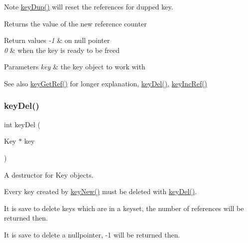 \begin{DoxyNote}{Note}
\hyperlink{group__key_gae6ec6a60cc4b8c1463fa08623d056ce3}{key\+Dup()} will reset the references for dupped key.
\end{DoxyNote}
\begin{DoxyReturn}{Returns}
the value of the new reference counter 
\end{DoxyReturn}

\begin{DoxyRetVals}{Return values}
{\em -\/1} & on null pointer \\
\hline
{\em 0} & when the key is ready to be freed \\
\hline
\end{DoxyRetVals}

\begin{DoxyParams}{Parameters}
{\em key} & the key object to work with \\
\hline
\end{DoxyParams}
\begin{DoxySeeAlso}{See also}
\hyperlink{group__key_ga4aabc4272506dd63161db2bbb42de8ae}{key\+Get\+Ref()} for longer explanation, \hyperlink{group__key_ga3df95bbc2494e3e6703ece5639be5bb1}{key\+Del()}, \hyperlink{group__key_ga6970a6f254d67af7e39f8e469bb162f1}{key\+Inc\+Ref()} 
\end{DoxySeeAlso}
\mbox{\label{group__key_ga3df95bbc2494e3e6703ece5639be5bb1}} 
\subsubsection{\texorpdfstring{key\+Del()}{keyDel()}}
{\footnotesize\ttfamily int key\+Del (\begin{DoxyParamCaption}\item[{Key $\ast$}]{key }\end{DoxyParamCaption})}



A destructor for Key objects. 

Every key created by \hyperlink{group__key_gad23c65b44bf48d773759e1f9a4d43b89}{key\+New()} must be deleted with \hyperlink{group__key_ga3df95bbc2494e3e6703ece5639be5bb1}{key\+Del()}.

It is save to delete keys which are in a keyset, the number of references will be returned then.

It is save to delete a nullpointer, -\/1 will be returned then.

